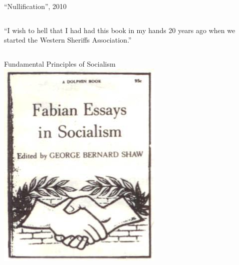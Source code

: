 \begin{frame}{``Nullification'', 2010}
\begin{columns}[c]
{            \vspace{10pt}
                \large{``I wish to hell that I had had this book in my hands 20 years ago when we started the Western Sheriffs Association.''}
            }
    \end{columns}
\end{frame}

%
%

\begin{frame}{Fundamental Principles of Socialism}
    \centering
    \includegraphics[height=.9\textheight]{img/fabian.png} \\
\end{frame}

